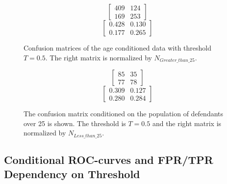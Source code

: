 \documentclass[11pt, fleqn, titlepage]{article}
\begin{document}
	
		\begin{figure}[h!]	
		\begin{multicols}{2}
			\begin{ceqn}
				\begin{equation*}
				\begin{bmatrix}
				409 & 124  \\
				169 & 253 
				\end{bmatrix} 
				\end{equation*} 
				\begin{equation*}
				\begin{bmatrix}
				0.428 & 0.130  \\
				0.177 & 0.265 
				\end{bmatrix} 
				\end{equation*}
			\end{ceqn}
		\end{multicols}
		{Confusion matrices of the age conditioned data with threshold $ T = 0.5 $. The right matrix is normalized by $ N_{Greater\_than\_25} $.}
	\end{figure}
	\begin{figure}[h!]	
		\begin{multicols}{2}
			\begin{ceqn}
				\begin{equation*}
				\begin{bmatrix}
				85 & 35  \\
				77 & 78 
				\end{bmatrix} 
				\end{equation*} 
				\begin{equation*}
				\begin{bmatrix}
				0.309 & 0.127 \\
				0.280 & 0.284 
				\end{bmatrix} 
				\end{equation*}
			\end{ceqn}
		\end{multicols}
		{The confusion matrix conditioned on the population of defendants over 25 is shown. The threshold is $ T = 0.5 $ and the right matrix is normalized by $ N_{Less\_than\_25} $.}
	\end{figure}
	
	
	\subsection{Conditional ROC-curves and FPR/TPR Dependency on Threshold}\label{ROC}
	
\end{document}
